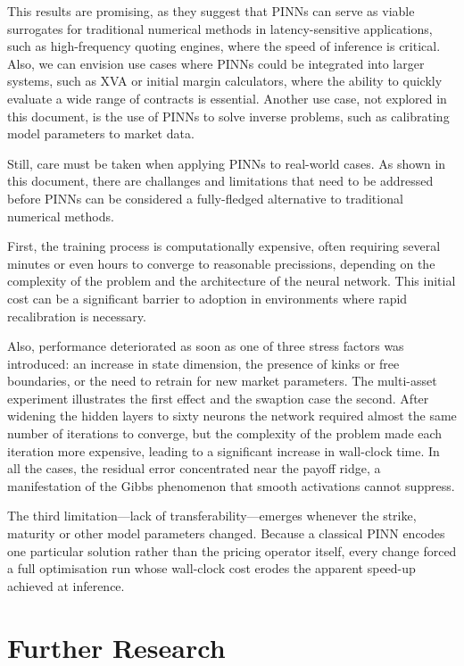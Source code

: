 \documentclass[12pt]{report} %
\theoremstyle{plain} %
\theoremstyle{definition} %
\theoremstyle{remark} %
\begin{document}
This results are promising, as they suggest that PINNs can serve as
viable surrogates for traditional numerical methods in latency-sensitive applications, such as 
high-frequency quoting engines, where the speed of inference is critical. Also, we can envision use 
cases where PINNs could be integrated into larger systems, such as XVA or initial margin calculators, 
where the ability to quickly evaluate a wide range of contracts is essential. Another use case, not explored in 
this document, is the use of PINNs to solve inverse problems, such as calibrating model parameters to market data.

Still, care must be taken when applying PINNs to real-world cases. As shown in this document, there 
are challanges and limitations that need to be addressed before PINNs can be considered a
fully-fledged alternative to traditional numerical methods. 

First, the training process is computationally expensive, often requiring several minutes or even 
hours to converge to reasonable precissions, depending on the complexity of the problem and the architecture of the neural network. This initial cost can be a
significant barrier to adoption in environments where rapid recalibration is necessary.

Also, performance deteriorated as soon as one of three stress factors was introduced: an increase in 
state dimension, the presence of kinks or free boundaries, or the need to retrain for new market 
parameters. The multi-asset experiment illustrates the first effect and the swaption case the second. 
After widening the hidden layers to sixty neurons the network required almost the same number of iterations to converge, 
but the complexity of the problem made each iteration more expensive, leading to a significant increase in wall-clock time.
In all the cases, the residual error concentrated near the payoff ridge, a manifestation of 
the Gibbs phenomenon that smooth activations cannot suppress. 

The third limitation—lack of 
transferability—emerges whenever the strike, maturity or other model parameters changed. Because a 
classical PINN encodes one particular solution rather than the pricing operator itself, every 
change forced a full optimisation run whose wall-clock cost erodes the apparent speed-up achieved 
at inference.

\section{Further Research}
\end{document}
